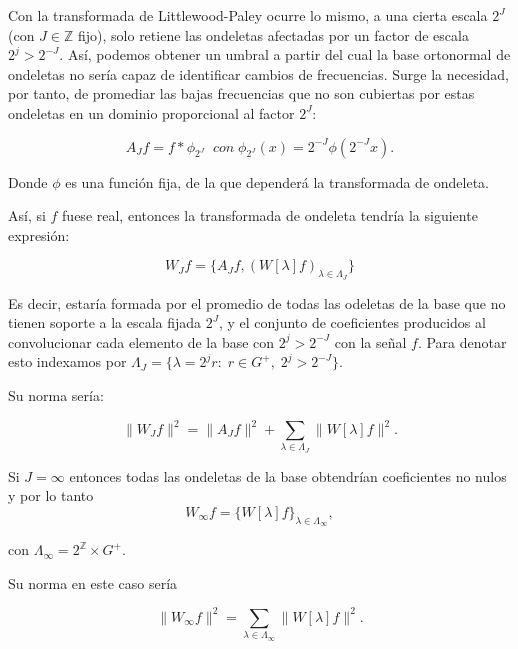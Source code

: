 \medskip

\noindent Con la transformada de Littlewood-Paley ocurre lo mismo, a una cierta escala $2^J$ (con $J \in \mathbb{Z}$ fijo), solo retiene las ondeletas afectadas por un factor de escala $2^j > 2^{-J}$. Así, podemos obtener un umbral a partir del cual la base ortonormal de ondeletas no sería capaz de identificar cambios de frecuencias. Surge la necesidad, por tanto, de promediar las bajas frecuencias que no son cubiertas por estas ondeletas en un dominio proporcional al factor $2^J$:

\begin{equation}
  A_Jf=f \ast \phi_ {2^J} \; \; con \; \phi_ {2^J}(x)=2^{-J} \phi(2^{-J}x).
\end{equation}

\medskip

\noindent Donde $\phi$ es una función fija, de la que dependerá la transformada de ondeleta.

\medskip

\noindent Así, si $f$ fuese real, entonces la transformada de ondeleta tendría la siguiente expresión: 

$$W_J f=\lbrace A_Jf,(W[\lambda]f)_{\lambda \in \Lambda_J} \rbrace$$ 

\noindent Es decir, estaría formada por el promedio de todas las odeletas de la base que no tienen soporte a la escala fijada $2^J$, y el conjunto de coeficientes producidos al convolucionar cada elemento de la base con $2^j>2^{-J}$ con la señal $f$. Para denotar esto indexamos por $\Lambda_J=\lbrace \lambda=2^jr:\;r\in G^{+}, \; 2^j>2^{-J}\rbrace$. 

\medskip

\noindent Su norma sería: 

\begin{equation} \label{eq::norma}
  \|W_Jf\|^2=\|A_Jf\|^2+\sum_{\lambda \in \Lambda_J} \|W[\lambda]f\|^2.
\end{equation}

\medskip
 
\noindent Si $J=\infty$ entonces todas las ondeletas de la base obtendrían coeficientes no nulos y por lo tanto 
$$W_\infty f=\lbrace W[\lambda]f\rbrace_{\lambda \in \Lambda_\infty},$$ 

\noindent con $\Lambda_\infty=2^\mathbb{Z} \times G^{+}$. 

\noindent Su norma en este caso sería 

$$\|W_\infty f\|^2=\sum_{\lambda \in \Lambda_\infty} \|W[\lambda]f\|^2.$$

